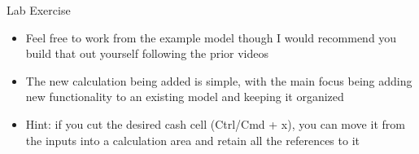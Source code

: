\documentclass[]{article}
\begin{document}
\begin{section}{Lab Exercise}
\begin{itemize}
\item Feel free to work from the example model though I would recommend you build that out yourself following the prior videos
\item The new calculation being added is simple, with the main focus being adding new functionality to an existing model and keeping it organized
\item Hint: if you cut the desired cash cell (Ctrl/Cmd + x), you can move it from the inputs into a calculation area and retain all the references to it
\end{itemize}
\end{section}
\end{document}
